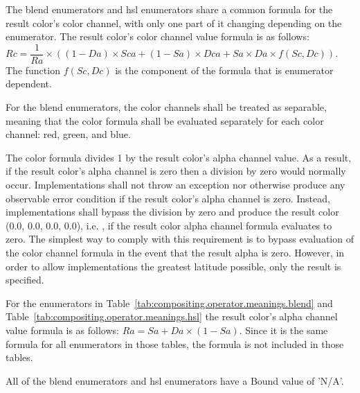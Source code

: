 \pnum
The blend enumerators and hsl enumerators share a common formula for the result 
color's color channel, with only one part of it changing depending on the 
enumerator. The result color's color channel value formula is as follows: $Rc = 
\dfrac{1}{Ra} \times ((1 - Da) \times Sca + (1 - Sa) \times Dca + Sa \times Da 
\times f(Sc, Dc))$. The function $f(Sc, Dc)$ is the component of the formula 
that is enumerator dependent.

\pnum
For the blend enumerators, the color channels shall be treated as separable, 
meaning that the color formula shall be evaluated separately for each color 
channel: red, green, and blue.

\pnum
The color formula divides 1 by the result color's alpha channel value. As a 
result, if the result color's alpha channel is zero then a division by zero 
would normally occur. Implementations shall not throw an exception nor  
otherwise produce any observable error condition if the result color's alpha 
channel is zero. Instead, implementations shall bypass the division by zero and 
produce the result color (0.0, 0.0, 0.0, 0.0), i.e. , if the result color alpha channel formula 
evaluates to zero.
\enternote
The simplest way to comply with this requirement is to bypass evaluation of the 
color channel formula in the event that the result alpha is zero. However, in 
order to allow implementations the greatest latitude possible, only the result 
is specified.
\exitnote

\pnum
For the enumerators in 
Table~\ref{tab:compositing.operator.meanings.blend} and 
Table~\ref{tab:compositing.operator.meanings.hsl} the result color's 
alpha channel value formula is as follows: $Ra = Sa + Da \times (1 - Sa)$.
\enternote
Since it is the same formula for all enumerators in those tables, the formula 
is not included in those tables.
\exitnote

\pnum
All of the blend enumerators and hsl enumerators have a Bound value of 'N/A'.

